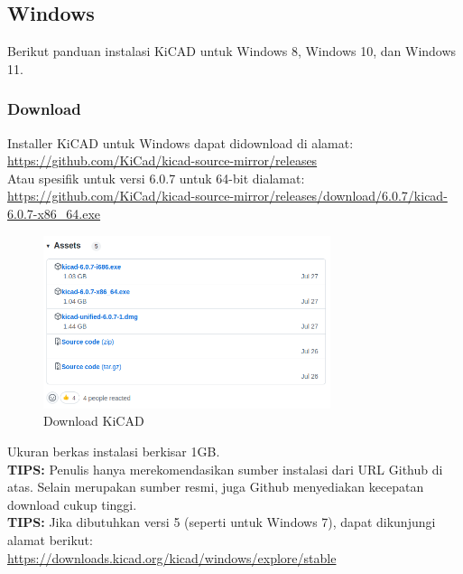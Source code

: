 \documentclass[12pt]{book}
\begin{document}
	\newpage
	\subsection{Windows}

	Berikut panduan instalasi KiCAD untuk Windows 8, Windows 10, dan Windows 11.

	\subsubsection{Download}

	Installer KiCAD untuk Windows dapat didownload di alamat:\\
	\url{https://github.com/KiCad/kicad-source-mirror/releases}\\

	Atau spesifik untuk versi 6.0.7 untuk 64-bit dialamat:\\
	\url{https://github.com/KiCad/kicad-source-mirror/releases/download/6.0.7/kicad-6.0.7-x86_64.exe}\\

	\begin{figure}[!ht]
		\centering
		\includegraphics[width=0.75\textwidth]{images/installations/kicad_github}
		\caption{Download KiCAD}
	\end{figure}

	Ukuran berkas instalasi berkisar 1GB.\\

	\textbf{TIPS:} Penulis hanya merekomendasikan sumber instalasi dari URL Github di atas.
	Selain merupakan sumber resmi, juga Github menyediakan kecepatan download cukup tinggi.\\

	\textbf{TIPS:} Jika dibutuhkan versi 5 (seperti untuk Windows 7), dapat dikunjungi alamat berikut:\\
	\url{https://downloads.kicad.org/kicad/windows/explore/stable}\\
\end{document}
